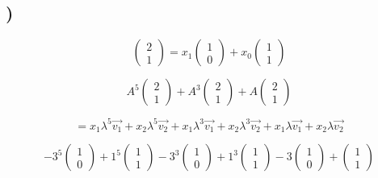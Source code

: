 \documentclass[a4paper,10pt,norsk]{article}
\begin{document}
\subsection{)}
\[\left(\begin{matrix} 2\\1 \end{matrix}\right) = x_{1}\left(\begin{matrix} 1\\0 \end{matrix}\right) + x_{0}\left(\begin{matrix} 1\\1 \end{matrix}\right)\]

\[A^{5}\left(\begin{matrix} 2\\1 \end{matrix}\right) + A^{3}\left(\begin{matrix} 2\\1 \end{matrix}\right) + A\left(\begin{matrix} 2\\1 \end{matrix}\right)\]

\[= x_{1}\lambda^{5}\vec{v_{1}} + x_{2}\lambda^{5}\vec{v_{2}} + x_{1}\lambda^{3}\vec{v_{1}} + x_{2}\lambda^{3}\vec{v_{2}} + x_{1}\lambda\vec{v_{1}} + x_{2}\lambda\vec{v_{2}}\]

\[-3^{5}\left(\begin{matrix} 1\\0 \end{matrix}\right) + 1^{5}\left(\begin{matrix} 1\\1 \end{matrix}\right) - 3^{3}\left(\begin{matrix} 1\\0 \end{matrix}\right) + 1^{3}\left(\begin{matrix} 1\\1 \end{matrix}\right) - 3\left(\begin{matrix} 1\\0 \end{matrix}\right) + \left(\begin{matrix} 1\\1 \end{matrix}\right)\]
\end{document}
